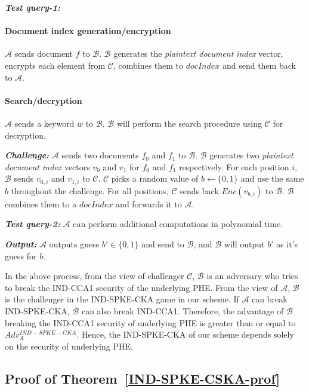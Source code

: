 \documentclass[sigconf,pdftex]{acmart}
\begin{document}
\textbf{\textit{Test query-1:}} 
        \paragraph*{Document index generation/encryption} $\mathcal{A}$ sends document $f$ to $\mathcal{B}$. $\mathcal{B}$ generates the \textit{plaintext document index} vector, encrypts each element from $\mathcal{C}$, combines them to $docIndex$ and send them back to $\mathcal{A}$.
        
        \paragraph*{Search/decryption} $\mathcal{A}$ sends a keyword $w$ to $\mathcal{B}$. $\mathcal{B}$ will perform the search procedure using $\mathcal{C}$ for decryption.

\textbf{\textit{Challenge:}} $\mathcal{A}$ sends two documents $f_0$ and $f_1$ to $\mathcal{B}$. $\mathcal{B}$ generates two \textit{plaintext document index} vectors $v_0$ and $v_1$ for $f_0$ and $f_1$ respectively. For each position $i$, $\mathcal{B}$ sends $v_{0,i}$ and $v_{1,i}$ to $\mathcal{C}$. $\mathcal{C}$ picks a random value of $b\leftarrow\{0, 1\}$ and use the same $b$ throughout the challenge. For all positions, $\mathcal{C}$ sends back $Enc(v_{b,i})$ to $\mathcal{B}$. $\mathcal{B}$ combines them to a $docIndex$ and forwards it to $\mathcal{A}$.


    \textbf{\textit{Test query-2:}} $\mathcal{A}$ can perform additional computations in polynomial time.

 \textbf{\textit{Output:}} $\mathcal{A}$ outputs guess $b'\in \{0,1\}$ and send to $\mathcal{B}$, and $\mathcal{B}$ will output $b'$ as it's guess for $b$.


In the above process, from the view of challenger $\mathcal{C}$, $\mathcal{B}$ is an adversary who tries to break the IND-CCA1 security of the underlying PHE. From the view of $\mathcal{A}$, $\mathcal{B}$ is the challenger in the IND-SPKE-CKA game in our scheme. If $\mathcal{A}$ can break IND-SPKE-CKA, $\mathcal{B}$ can also break IND-CCA1. Therefore, the advantage of $\mathcal{B}$ breaking the IND-CCA1 security of underlying PHE is greater than or equal to $Adv_{A}^{IND-SPKE-CKA}$. Hence, the IND-SPKE-CKA of our scheme depends solely on the security of underlying PHE.


\subsection{Proof of Theorem~\ref{IND-SPKE-CSKA-prof}}\label{app-IND-SPKE-CSKA-prof}
\end{document}
